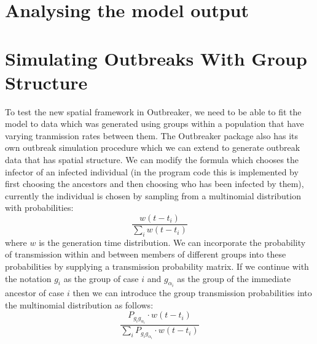 \documentclass[11pt,a4paper]{report}
\begin{document}
\section{Analysing the model output}


\section{Simulating Outbreaks With Group Structure}
To test the new spatial framework in Outbreaker, we need to be able to fit the model to data which was generated using groups within a population that have varying tranmission rates between them.
The Outbreaker package also has its own outbreak simulation procedure which we can extend to generate outbreak data that has spatial structure. We can modify the formula which chooses the infector of an infected individual (in the program code this is implemented by first choosing the ancestors and then choosing who has been infected by them), currently the individual is chosen by sampling from a multinomial distribution with probabilities:
\[ \frac{w(t-t_i)}{\sum_i{w(t-t_i)}} \]
where $w$ is the generation time distribution. We can incorporate the probability of transmission within and between members of different groups into these probabilities by supplying a transmission probability matrix. If we continue with the notation $g_{i}$ as the group of case $i$ and $g_{\alpha_{i}}$ as the group of the immediate ancestor of case $i$ then we can introduce the group transmission probabilities into the multinomial distribution as follows:
\[ \frac{P_{g_{i}g_{\alpha_{i}}} \cdot w(t-t_i)}{\sum_i{P_{g_{i}g_{\alpha_{i}}} \cdot w(t-t_i)}}\]
\end{document}
